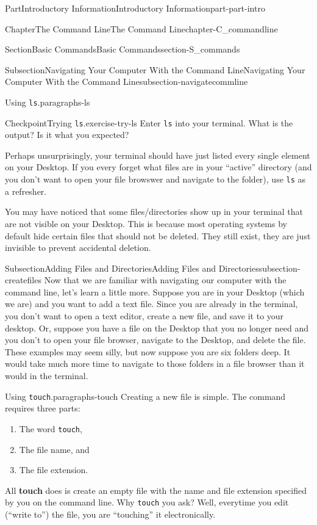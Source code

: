 \documentclass[twoside,10pt,]{book}
\newcommand{\mono}[1]{\texttt{#1}}
\newcommand{\terminology}[1]{\textbf{#1}}
\begin{document}
\begin{partptx}{Part}{Introductory Information}{}{Introductory Information}{}{}{part-part-intro}
\begin{chapterptx}{Chapter}{The Command Line}{}{The Command Line}{}{}{chapter-C_commandline}
\begin{sectionptx}{Section}{Basic Commands}{}{Basic Commands}{}{}{section-S_commands}
\begin{subsectionptx}{Subsection}{Navigating Your Computer With the Command Line}{}{Navigating Your Computer With the Command Line}{}{}{subsection-navigatecommline}
\begin{paragraphs}{Using \mono{ls}.}{paragraphs-ls}
\begin{inlineexercise}{Checkpoint}{Trying \mono{ls}.}{exercise-try-ls}%
Enter \mono{ls} into your terminal. What is the output? Is it what you expected?%
\end{inlineexercise}%
Perhaps unsurprisingly, your terminal should have just listed every single element on your Desktop. If you every forget what files are in your ``active'' directory (and you don't want to open your file browswer and navigate to the folder), use \mono{ls} as a refresher.%
\par
You may have noticed that some files\slash{}directories show up in your terminal that are not visible on your Desktop. This is because most operating systems by default hide certain files that should not be deleted. They still exist, they are just invisible to prevent accidental deletion.%
\end{paragraphs}%
\end{subsectionptx}
%
%
\typeout{************************************************}
\typeout{************************************************}
%
\begin{subsectionptx}{Subsection}{Adding Files and Directories}{}{Adding Files and Directories}{}{}{subsection-createfiles}
%
Now that we are familiar with navigating our computer with the command line, let's learn a little more. Suppose you are in your Desktop (which we are) and you want to add a text file. Since you are already in the terminal, you don't want to open a text editor, create a new file, and save it to your desktop. Or, suppose you have a file on the Desktop that you no longer need and you don't to open your file browser, navigate to the Desktop, and delete the file. These examples may seem silly, but now suppose you are six folders deep. It would take much more time to navigate to those folders in a file browser than it would in the terminal.%
\begin{paragraphs}{Using \mono{touch}.}{paragraphs-touch}%
\index{\mono{touch}}%
\index{command line!\mono{touch}}%
Creating a new file is simple. The command requires three parts:%
\begin{enumerate}
\item{}The word \mono{touch},%
\item{}The file name, and%
\item{}The file extension.%
\end{enumerate}
All \terminology{touch} does is create an empty file with the name and file extension specified by you on the command line. Why \mono{touch} you ask? Well, everytime you edit (``write to'') the file, you are ``touching'' it electronically.%

\end{paragraphs}
\end{subsectionptx}
\end{sectionptx}
\end{chapterptx}
\end{partptx}
\end{document}

